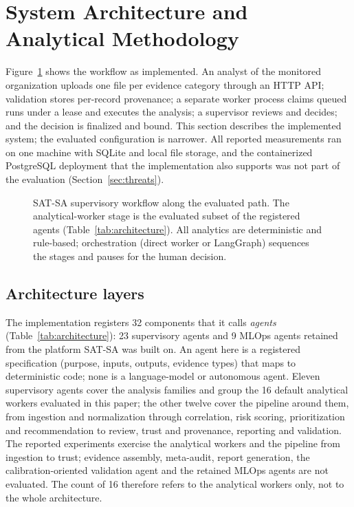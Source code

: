 \section{System Architecture and Analytical Methodology}
\label{sec:system}

Figure~\ref{fig:architecture} shows the workflow as implemented. An analyst of the
monitored organization uploads one file per evidence category through an HTTP API;
validation stores per-record provenance; a separate worker process claims queued
runs under a lease and executes the analysis; a supervisor reviews and decides; and
the decision is finalized and bound. This section describes the implemented
system; the evaluated configuration is narrower. All reported measurements ran on
one machine with SQLite and local file storage, and the containerized PostgreSQL
deployment that the implementation also supports was not part of the evaluation
(Section~\ref{sec:threats}).

\begin{figure}[!htbp]
\centering

\caption{SAT-SA supervisory workflow along the evaluated path. The analytical-worker
stage is the evaluated subset of the registered agents (Table~\ref{tab:architecture}).
All analytics are deterministic and rule-based; orchestration (direct worker or
LangGraph) sequences the stages and pauses for the human decision.}
\label{fig:architecture}
\end{figure}

\subsection{Architecture layers}
The implementation registers 32 components that it calls
\emph{agents} (Table~\ref{tab:architecture}): 23 supervisory agents
and 9 MLOps agents retained from the platform SAT-SA was built on.
An agent here is a registered specification (purpose, inputs, outputs, evidence types)
that maps to deterministic code; none is a language-model or autonomous agent. Eleven
supervisory agents cover the analysis families and group the 16 default
analytical workers evaluated in this paper; the other twelve cover the pipeline around
them, from ingestion and normalization through correlation, risk scoring,
prioritization and recommendation to review, trust and provenance, reporting and
validation. The reported experiments exercise the analytical workers and the
pipeline from ingestion to trust; evidence assembly, meta-audit, report generation,
the calibration-oriented validation agent and the retained MLOps agents are not
evaluated. The count of 16 therefore refers to the analytical workers
only, not to the whole architecture.

